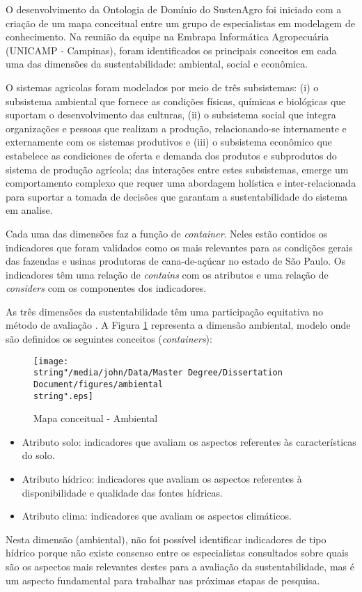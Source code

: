 O desenvolvimento da Ontologia de Domínio do SustenAgro foi iniciado
com a criação de um mapa conceitual entre um grupo de especialistas
em modelagem de conhecimento. Na reunião da equipe na Embrapa Informática
Agropecuária (UNICAMP - Campinas), foram identificados os principais
conceitos em cada uma das dimensões da sustentabilidade: ambiental,
social e econômica. 

O sistemas agricolas foram modelados por meio de três subsistemas:
(i) o subsistema ambiental que fornece as condições físicas, químicas
e biológicas que suportam o desenvolvimento das culturas, (ii) o subsistema
social que integra organizações e pessoas que realizam a produção,
relacionando-se internamente e externamente com os sistemas produtivos
e (iii) o subsistema econômico que estabelece as condiciones de oferta
e demanda dos produtos e subprodutos do sistema de produção agrícola;
das interações entre estes subsistemas, emerge um comportamento complexo
que requer uma abordagem holística e inter-relacionada para suportar
a tomada de decisões que garantam a sustentabilidade do sistema em
analise.

Cada uma das dimensões faz a função de \emph{container}. Neles estão
contidos os indicadores que foram validados como os mais relevantes
para as condições gerais das fazendas e usinas produtoras de cana-de-açúcar
no estado de São Paulo. Os indicadores têm uma relação de \emph{contains}
com os atributos e uma relação de \emph{considers} com os componentes
dos indicadores.

As três dimensões da sustentabilidade têm uma participação equitativa
no método de avaliação \citep{kraines2011system}. A Figura \ref{fig:environment}
representa a dimensão ambiental, modelo onde são definidos os seguintes
conceitos (\emph{containers}):

\begin{figure}
\begin{centering}
\texttt{[image: \\string"/media/john/Data/Master Degree/Dissertation Document/figures/ambiental\\string".eps]}
\par\end{centering}
\caption{Mapa conceitual - Ambiental\label{fig:environment}}
\end{figure}

\begin{itemize}
\item Atributo solo: indicadores que avaliam os aspectos referentes às características
do solo.
\item Atributo hídrico: indicadores que avaliam os aspectos referentes à
disponibilidade e qualidade das fontes hídricas.
\item Atributo clima: indicadores que avaliam os aspectos climáticos.
\end{itemize}
Nesta dimensão (ambiental), não foi possível identificar indicadores
de tipo hídrico porque não existe consenso entre os especialistas
consultados sobre quais são os aspectos mais relevantes destes para
a avaliação da sustentabilidade, mas é um aspecto fundamental para
trabalhar nas próximas etapas de pesquisa.

